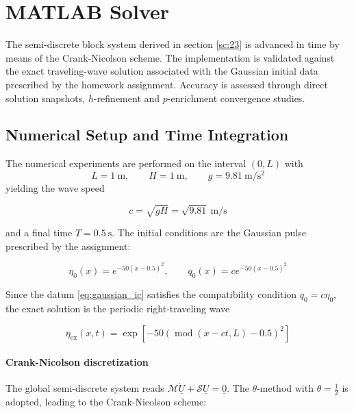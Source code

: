 
\section{MATLAB Solver}
\label{sc:24}

The semi-discrete block system derived in section \ref{sc:23} is advanced in time by means of the Crank-Nicolson scheme. The implementation is validated against the exact traveling-wave solution associated with the Gaussian initial data prescribed by the homework assignment. Accuracy is assessed through direct solution snapshots, \(h\)-refinement and \(p\)-enrichment convergence studies.

\subsection{Numerical Setup and Time Integration}

The numerical experiments are performed on the interval \((0,L)\) with
\[
L = \SI{1}{\meter}, \qquad H = \SI{1}{\meter}, \qquad g = \SI{9.81}{\meter\per\second\squared}
\]
yielding the wave speed

\begin{equation}
c = \sqrt{gH} = \sqrt{9.81}\ \si{\meter\per\second}
\label{eq:wave_speed}
\end{equation}

and a final time \(T = \SI{0.5}{\second}\). The initial conditions are the Gaussian pulse prescribed by the assignment:

\begin{equation}
\eta_0(x) = e^{-50(x-0.5)^2}, \qquad q_0(x) = c  e^{-50(x-0.5)^2}
\label{eq:gaussian_ic}
\end{equation}

Since the datum \eqref{eq:gaussian_ic} satisfies the compatibility condition \(q_0 = c\eta_0\), the exact solution is the periodic right-traveling wave

\begin{equation}
\eta_{\mathrm{ex}}(x,t) = \exp\!\left[-50\left(\operatorname{mod}(x-ct, L)-0.5\right)^2\right]
\label{eq:gaussian_exact}
\end{equation}

\paragraph{Crank-Nicolson discretization}
The global semi-discrete system reads \(\mathcal{M}\dot{\underline{U}} + \mathcal{S}\underline{U} = \underline{0}\). The \(\theta\)-method with \(\theta = \tfrac{1}{2}\) is adopted, leading to the Crank-Nicolson scheme:

